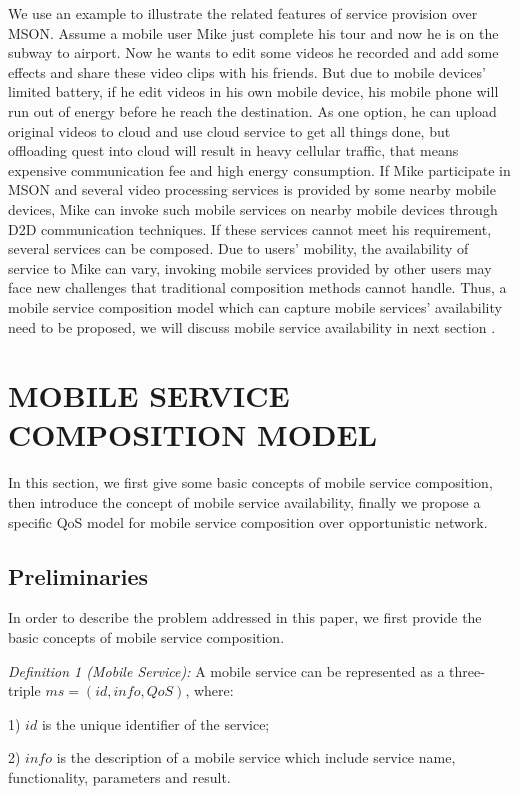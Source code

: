 \documentclass[10pt,journal,compsoc]{IEEEtran}
\begin{document}
We use an example to illustrate the related features of service provision over MSON. Assume a mobile user Mike just complete his tour and now he is on the subway to airport. Now he wants to edit some videos he recorded and add some effects and share these video clips with his friends. But due to mobile devices' limited battery, if he edit videos in his own mobile device, his mobile phone will run out of energy before he reach the destination. As one option, he can upload original videos to cloud and use cloud service to get all things done, but offloading quest into cloud will result in heavy cellular traffic, that means expensive communication fee and high energy consumption. If Mike participate in MSON and several video processing services is provided by some nearby mobile devices, Mike can invoke such mobile services on nearby mobile devices through D2D communication techniques. If these services cannot meet his requirement, several services can be composed. Due to users' mobility, the availability of service to Mike can vary, invoking mobile services provided by other users may face new challenges that traditional composition methods cannot handle. Thus, a mobile service composition model which can capture mobile services' availability need to be proposed, we will discuss mobile service availability in next section \cite{Deng2016-2}.


\section{MOBILE SERVICE COMPOSITION MODEL}
In this section, we first give some basic concepts of mobile service composition, then introduce the concept of mobile service availability, finally we propose a specific QoS model for mobile service composition over opportunistic network.
\subsection{Preliminaries}
In order to describe the problem addressed in this paper, we first provide the basic concepts of mobile service composition.

\textit{Definition 1 (Mobile Service):} A mobile service can be represented as a three-triple $ms = (id, info, QoS)$, where:

​1) $id$ is the unique identifier of the service;

2) $info$ is the description of a mobile service which include service name, functionality, parameters and result.
\end{document}
